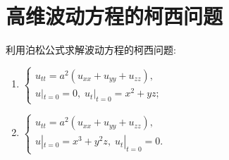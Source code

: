 

\section{高维波动方程的柯西问题}

\begin{exercise}
  利用泊松公式求解波动方程的柯西问题:
  \begin{enumerate}[(1)]
    \item $\begin{cases}
            u_{tt} = a^2(u_{xx}+u_{yy}+u_{zz}), \\
            u|_{t=0}=0,\; u_t|_{t=0}=x^2+yz;
          \end{cases}$
    \item $\begin{cases}
            u_{tt} = a^2(u_{xx}+u_{yy}+u_{zz}), \\
            u|_{t=0}=x^3+y^2z,\; u_t|_{t=0}=0.
           \end{cases}$
  \end{enumerate}
\end{exercise}

